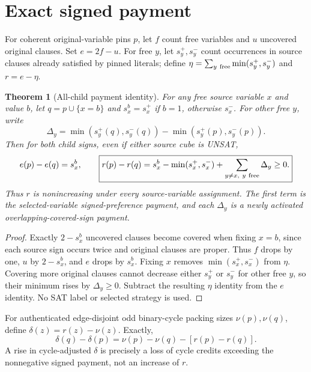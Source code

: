 \documentclass[11pt]{article}
\newtheorem{theorem}{Theorem}
\begin{document}
\section{Exact signed payment}
For coherent original-variable pins $p$, let $f$ count free variables and $u$ uncovered original clauses. Set $e=2f-u$. For free $y$, let $s_y^+,s_y^-$ count occurrences in source clauses already satisfied by pinned literals; define $\eta=\sum_{y\ {\rm free}}\min(s_y^+,s_y^-)$ and $r=e-\eta$.
\begin{theorem}[All-child payment identity]
For any free source variable $x$ and value $b$, let $q=p\cup\{x=b\}$ and $s_x^b=s_x^+$ if $b=1$, otherwise $s_x^-$. For other free $y$, write
\[
\Delta_y=\min(s_y^+(q),s_y^-(q))-\min(s_y^+(p),s_y^-(p)).
\]
Then for both child signs, even if either source cube is UNSAT,
\[
e(p)-e(q)=s_x^b,\qquad
\boxed{r(p)-r(q)=s_x^b-\min(s_x^+,s_x^-)+\sum_{y\ne x,\ y\ {\rm free}}\Delta_y\ge0.}
\]
Thus $r$ is nonincreasing under every source-variable assignment. The first term is the selected-variable signed-preference payment, and each $\Delta_y$ is a newly activated overlapping-covered-sign payment.
\end{theorem}
\begin{proof}
Exactly $2-s_x^b$ uncovered clauses become covered when fixing $x=b$, since each source sign occurs twice and original clauses are proper. Thus $f$ drops by one, $u$ by $2-s_x^b$, and $e$ drops by $s_x^b$. Fixing $x$ removes $\min(s_x^+,s_x^-)$ from $\eta$. Covering more original clauses cannot decrease either $s_y^+$ or $s_y^-$ for other free $y$, so their minimum rises by $\Delta_y\ge0$. Subtract the resulting $\eta$ identity from the $e$ identity. No SAT label or selected strategy is used.
\end{proof}
For authenticated edge-disjoint odd binary-cycle packing sizes $\nu(p),\nu(q)$, define $\delta(z)=r(z)-\nu(z)$. Exactly,
\[
\delta(q)-\delta(p)=\nu(p)-\nu(q)-[r(p)-r(q)].
\]
A rise in cycle-adjusted $\delta$ is precisely a loss of cycle credits exceeding the nonnegative signed payment, not an increase of $r$.
\end{document}
